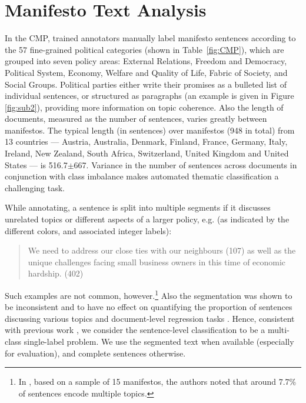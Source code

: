 \documentclass[11pt,a4paper]{article}
\newcommand{\tabref}[2][]{Table#1~\ref{#2}\xspace}
\begin{document}
\section{Manifesto Text Analysis}
 In the CMP, trained annotators manually label manifesto sentences according to the 57 fine-grained political categories (shown in \tabref{fig:CMP}), which are grouped into seven policy areas: External Relations, Freedom and Democracy, Political System, Economy, Welfare and Quality of Life, Fabric of Society, and Social Groups. Political parties either write their promises as a bulleted list of individual sentences, or structured as paragraphs (an example is given in Figure \ref{fig:sub2}), providing more information on topic coherence. Also the length of documents, measured as the number of sentences, varies greatly between manifestos. The typical length (in sentences) over manifestos (948 in total) from 13 countries --- Austria, Australia, Denmark, Finland, France, Germany, Italy, Ireland, New Zealand, South Africa, Switzerland, United Kingdom and United States --- is 516.7$\pm$667. Variance in the number of sentences across documents in conjunction with class imbalance makes automated thematic classification a challenging task.  

While annotating, a sentence is split into multiple segments if it discusses unrelated topics or different aspects of a larger policy, e.g. (as indicated by the different colors, and associated integer labels):
\begin{quote}
\color{red}
We need to address our close ties with our neighbours (107) \color{blue} as well as the unique challenges facing small business owners in this time of economic hardship. (402)
\end{quote}
Such examples are not common, however.\footnote{In , based on a sample of 15 manifestos, the authors noted that around 7.7\% of sentences encode multiple topics.} Also the segmentation was shown to be inconsistent and to have no effect on quantifying the proportion of sentences discussing various topics and document-level regression tasks \cite{daubler2012natural}. Hence, consistent with previous work \cite{biessmann2016automating, W17-2906}, we consider the sentence-level classification to be a multi-class single-label problem. We use the segmented text when available (especially for evaluation), and complete sentences otherwise.
\end{document}
